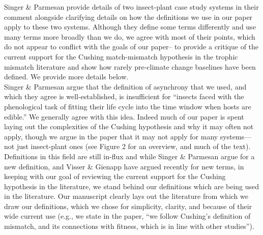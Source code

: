 \documentclass[11pt,letter]{article}
\begin{document}

\renewcommand{\refname}{\CHead{}}

Singer \& Parmesan provide details of two insect-plant case study systems in their comment alongside clarifying details on how the definitions we use in our paper apply to these two systems. Although they define some terms differently and use many terms more broadly than we do, we agree with most of their points, which do not appear to conflict with the goals of our paper-- to provide a critique of the current support for the Cushing match-mismatch hypothesis in the trophic mismatch literature and show how rarely pre-climate change baselines have been defined. We provide more details below.\\

Singer \& Parmesan argue that the definition of asynchrony that we used, and which they agree is well-established, is insufficient for ``insects faced with the phenological task of fitting their life cycle into the time window when hosts are edible.''  We generally agree with this idea. Indeed much of our paper is spent laying out the complexities of the Cushing hypothesis and why it may often not apply, though we argue in the paper that it may not apply for many systems---not just insect-plant ones (see Figure 2 for an overview, and much of the text). Definitions in this field are still in-flux and while Singer \& Parmesan argue for a new definition, and Visser \& Gienapp have argued recently for new terms, in keeping with our goal of reviewing the current support for the Cushing hypothesis in the literature, we stand behind our definitions which are being used in the literature. Our manuscript clearly lays out the literature from which we draw our definitions, which we chose for simplicity, clarity, and because of their wide current use (e.g., we state in the paper, ``we follow Cushing’s definition of mismatch, and its connections with fitness, which is in line with other studies''). \\%
\end{document}
